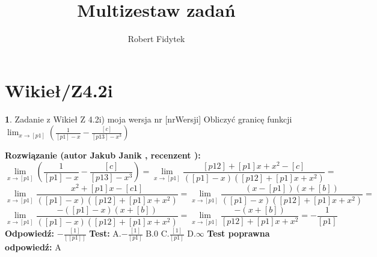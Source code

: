 \documentclass[12pt, a4paper]{article}
\title{Multizestaw zadań}
\author{Robert Fidytek}
\date{}
\theoremstyle{definition} %
\newtheorem{zad}{}
\newcommand{\kategoria}[1]{\section{#1}} %
\newcommand{\zadStart}[1]{\begin{zad}#1\newline} %
\newcommand{\zadStop}{\end{zad}}   %
\newcommand{\rozwStart}[2]{\noindent \textbf{Rozwiązanie (autor #1 , recenzent #2): }\newline} %
\newcommand{\rozwStop}{\newline}                                            %
\newcommand{\odpStart}{\noindent \textbf{Odpowiedź:}\newline}    %
\newcommand{\odpStop}{\newline}                                             %
\newcommand{\testStart}{\noindent \textbf{Test:}\newline} %
\newcommand{\testStop}{\newline} %
\newcommand{\kluczStart}{\noindent \textbf{Test poprawna odpowiedź:}\newline} %
\newcommand{\kluczStop}{\newline} %
\begin{document}
\maketitle


\kategoria{Wikieł/Z4.2i}
\zadStart{Zadanie z Wikieł Z 4.2i) moja wersja nr [nrWersji]}
Obliczyć granicę funkcji $\lim_{x \to [p1]} (\frac{1}{[p1]-x} - \frac{[c]}{[p13]-x^3})$
\zadStop
\rozwStart{Jakub Janik}{}
$$\lim_{x \to [p1]} (\frac{1}{[p1]-x} - \frac{[c]}{[p13]-x^3})=\lim_{x \to [p1]} \frac{[p12]+[p1]x+x^2-[c]}{([p1]-x)([p12]+[p1]x+x^2)}=$$
$$\lim_{x \to [p1]} \frac{x^2+[p1]x-[c1]}{([p1]-x)([p12]+[p1]x+x^2)}=\lim_{x \to [p1]} \frac{(x-[p1])(x+[b])}{([p1]-x)([p12]+[p1]x+x^2)}=$$
$$\lim_{x \to [p1]} \frac{-([p1]-x)(x+[b])}{([p1]-x)([p12]+[p1]x+x^2)}=\lim_{x \to [p1]} \frac{-(x+[b])}{[p12]+[p1]x+x^2}=-\frac{1}{[p1]}$$
\rozwStop
\odpStart
$-\frac{[1]}{[[p1]]}$
\odpStop
\testStart
A.$-\frac{[1]}{[p1]}$
B.$0$
C.$\frac{[1]}{[p1]}$
D.$\infty$
\testStop
\kluczStart
A
\kluczStop
\end{document}

